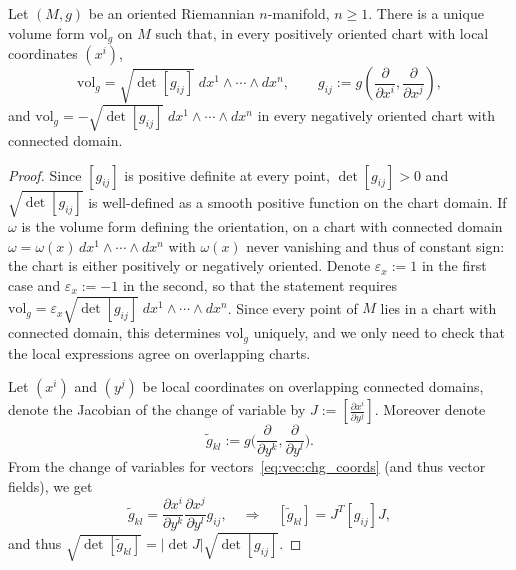 \begin{proposition}\label{prop:riemannian-volume}
	Let $(M,g)$ be an oriented Riemannian $n$-manifold, $n\geq1$.
	There is a unique volume form $\mathrm{vol}_g$ on $M$ such that, in every positively oriented chart with local coordinates $(x^i)$,
	\begin{equation}\label{eq:riemannian-volume}
		\mathrm{vol}_g = \sqrt{\det[g_{ij}]}\; dx^1\wedge\cdots\wedge dx^n,
		\qquad g_{ij} := g\left(\frac{\partial}{\partial x^i}, \frac{\partial}{\partial x^j}\right),
	\end{equation}
	and $\mathrm{vol}_g = -\sqrt{\det[g_{ij}]}\; dx^1\wedge\cdots\wedge dx^n$ in every negatively oriented chart with connected domain.
\end{proposition}
\begin{proof}
	Since $[g_{ij}]$ is positive definite at every point, $\det[g_{ij}]>0$ and $\sqrt{\det[g_{ij}]}$ is well-defined as a smooth positive function on the chart domain.
	If $\omega$ is the volume form defining the orientation, on a chart with connected domain $\omega = \omega(x)\,dx^1\wedge\cdots\wedge dx^n$ with $\omega(x)$ never vanishing and thus of constant sign: the chart is either positively or negatively oriented.
	Denote $\varepsilon_x := 1$ in the first case and $\varepsilon_x:=-1$ in the second, so that the statement requires $\mathrm{vol}_g = \varepsilon_x\sqrt{\det[g_{ij}]}\; dx^1\wedge\cdots\wedge dx^n$.
	Since every point of $M$ lies in a chart with connected domain, this determines $\mathrm{vol}_g$ uniquely, and we only need to check that the local expressions agree on overlapping charts.

	Let $(x^i)$ and $(y^j)$ be local coordinates on overlapping connected domains, denote the Jacobian of the change of variable by $J := \left[\frac{\partial x^i}{\partial y^j}\right]$. Moreover denote
	\begin{equation}
	  \widetilde g_{kl} := g\big(\frac{\partial}{\partial y^k}, \frac{\partial}{\partial y^l}\big).
	\end{equation}
	From the change of variables for vectors~\ref{eq:vec:chg_coords} (and thus vector fields), we get
	\begin{equation}
	  \widetilde g_{kl} = \frac{\partial x^i}{\partial y^k}\frac{\partial x^j}{\partial y^l}g_{ij},
		\quad\Rightarrow\quad
		[\widetilde g_{kl}] = J^T[g_{ij}]J,
	\end{equation}
	and thus $\sqrt{\det[\widetilde g_{kl}]} = |\det J|\sqrt{\det[g_{ij}]}$.


\end{proof}
